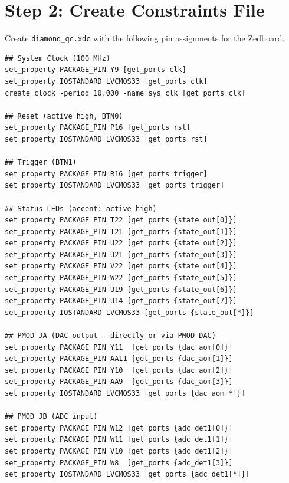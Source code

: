 \documentclass[11pt,a4paper,openany]{book}
\begin{document}
\section{Step 2: Create Constraints File}

Create \texttt{diamond\_qc.xdc} with the following pin assignments for the Zedboard.

\begin{lstlisting}[language={},caption={diamond\_qc.xdc --- Pin constraints for Zedboard},numbers=none]
## System Clock (100 MHz)
set_property PACKAGE_PIN Y9 [get_ports clk]
set_property IOSTANDARD LVCMOS33 [get_ports clk]
create_clock -period 10.000 -name sys_clk [get_ports clk]

## Reset (active high, BTN0)
set_property PACKAGE_PIN P16 [get_ports rst]
set_property IOSTANDARD LVCMOS33 [get_ports rst]

## Trigger (BTN1)
set_property PACKAGE_PIN R16 [get_ports trigger]
set_property IOSTANDARD LVCMOS33 [get_ports trigger]

## Status LEDs (accent: active high)
set_property PACKAGE_PIN T22 [get_ports {state_out[0]}]
set_property PACKAGE_PIN T21 [get_ports {state_out[1]}]
set_property PACKAGE_PIN U22 [get_ports {state_out[2]}]
set_property PACKAGE_PIN U21 [get_ports {state_out[3]}]
set_property PACKAGE_PIN V22 [get_ports {state_out[4]}]
set_property PACKAGE_PIN W22 [get_ports {state_out[5]}]
set_property PACKAGE_PIN U19 [get_ports {state_out[6]}]
set_property PACKAGE_PIN U14 [get_ports {state_out[7]}]
set_property IOSTANDARD LVCMOS33 [get_ports {state_out[*]}]

## PMOD JA (DAC output - directly or via PMOD DAC)
set_property PACKAGE_PIN Y11  [get_ports {dac_aom[0]}]
set_property PACKAGE_PIN AA11 [get_ports {dac_aom[1]}]
set_property PACKAGE_PIN Y10  [get_ports {dac_aom[2]}]
set_property PACKAGE_PIN AA9  [get_ports {dac_aom[3]}]
set_property IOSTANDARD LVCMOS33 [get_ports {dac_aom[*]}]

## PMOD JB (ADC input)
set_property PACKAGE_PIN W12 [get_ports {adc_det1[0]}]
set_property PACKAGE_PIN W11 [get_ports {adc_det1[1]}]
set_property PACKAGE_PIN V10 [get_ports {adc_det1[2]}]
set_property PACKAGE_PIN W8  [get_ports {adc_det1[3]}]
set_property IOSTANDARD LVCMOS33 [get_ports {adc_det1[*]}]
\end{lstlisting}

\end{document}

